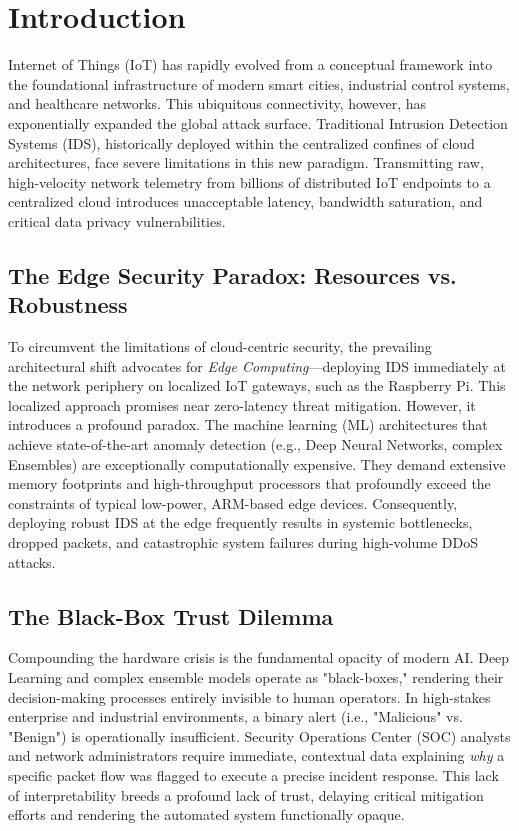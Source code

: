 \section{Introduction}
 Internet of Things (IoT) has rapidly evolved from a conceptual framework into the foundational infrastructure of modern smart cities, industrial control systems, and healthcare networks. This ubiquitous connectivity, however, has exponentially expanded the global attack surface. Traditional Intrusion Detection Systems (IDS), historically deployed within the centralized confines of cloud architectures, face severe limitations in this new paradigm. Transmitting raw, high-velocity network telemetry from billions of distributed IoT endpoints to a centralized cloud introduces unacceptable latency, bandwidth saturation, and critical data privacy vulnerabilities.

\subsection{The Edge Security Paradox: Resources vs. Robustness}
To circumvent the limitations of cloud-centric security, the prevailing architectural shift advocates for \textit{Edge Computing}—deploying IDS immediately at the network periphery on localized IoT gateways, such as the Raspberry Pi. This localized approach promises near zero-latency threat mitigation. However, it introduces a profound paradox. The machine learning (ML) architectures that achieve state-of-the-art anomaly detection (e.g., Deep Neural Networks, complex Ensembles) are exceptionally computationally expensive. They demand extensive memory footprints and high-throughput processors that profoundly exceed the constraints of typical low-power, ARM-based edge devices. Consequently, deploying robust IDS at the edge frequently results in systemic bottlenecks, dropped packets, and catastrophic system failures during high-volume DDoS attacks.

\subsection{The Black-Box Trust Dilemma}
Compounding the hardware crisis is the fundamental opacity of modern AI. Deep Learning and complex ensemble models operate as "black-boxes," rendering their decision-making processes entirely invisible to human operators. In high-stakes enterprise and industrial environments, a binary alert (i.e., "Malicious" vs. "Benign") is operationally insufficient. Security Operations Center (SOC) analysts and network administrators require immediate, contextual data explaining \textit{why} a specific packet flow was flagged to execute a precise incident response. This lack of interpretability breeds a profound lack of trust, delaying critical mitigation efforts and rendering the automated system functionally opaque.

